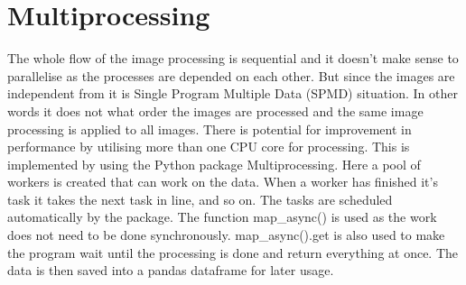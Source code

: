 \section{Multiprocessing}
The whole flow of the image processing is sequential and it doesn't make sense to parallelise as the processes are depended on each other. But since the images are independent from it is Single Program Multiple Data (SPMD) situation. In other words it does not what order the images are processed and the same image processing is applied to all images. There is potential for improvement in performance by utilising more than one CPU core for processing. This is implemented by using the Python package Multiprocessing. Here a pool of workers is created that can work on the data. When a worker has finished it's task it takes the next task in line, and so on. The tasks are scheduled automatically by the package. The function map_async() is used as the work does not need to be done synchronously. map_async().get is also used to make the program wait until the processing is done and return everything at once. The data is then saved into a pandas dataframe for later usage.